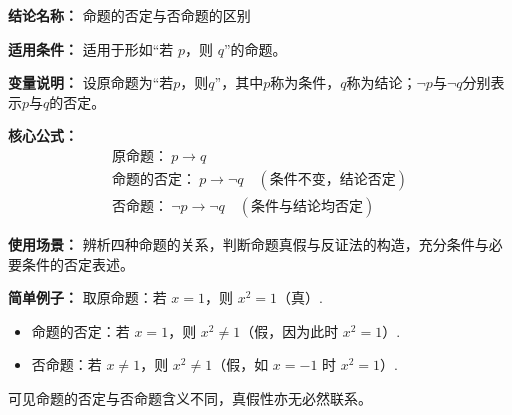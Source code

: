 \textbf{结论名称：} 命题的否定与否命题的区别

\textbf{适用条件：} 适用于形如“若 \(p\)，则 \(q\)”的命题。

\textbf{变量说明：} 
设原命题为“若\(p\)，则\(q\)”，其中\(p\)称为条件，\(q\)称为结论；\(\neg p\)与\(\neg q\)分别表示\(p\)与\(q\)的否定。

\textbf{核心公式：}
\[
\boxed{
\begin{array}{c}
\text{原命题：}\ p \rightarrow q \\
\text{命题的否定：}\ p \rightarrow \neg q \quad (\text{条件不变，结论否定}) \\
\text{否命题：}\ \neg p \rightarrow \neg q \quad (\text{条件与结论均否定})
\end{array}
}
\]

\textbf{使用场景：} 辨析四种命题的关系，判断命题真假与反证法的构造，充分条件与必要条件的否定表述。

\textbf{简单例子：} 
取原命题：若 \(x=1\)，则 \(x^2=1\)（真）.
\begin{itemize}
\item 命题的否定：若 \(x=1\)，则 \(x^2 \neq 1\)（假，因为此时 \(x^2=1\)）.
\item 否命题：若 \(x \neq 1\)，则 \(x^2 \neq 1\)（假，如 \(x=-1\) 时 \(x^2=1\)）.
\end{itemize}
可见命题的否定与否命题含义不同，真假性亦无必然联系。